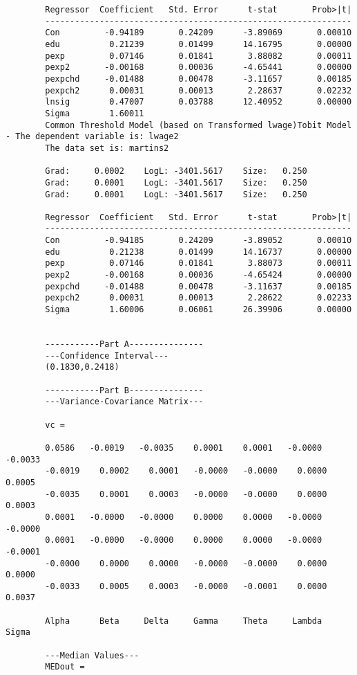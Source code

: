 \documentclass[12pt]{article}
\begin{document}
\begin{verbatim}
		Regressor  Coefficient	 Std. Error 	 t-stat       Prob>|t|
		--------------------------------------------------------------
		Con         -0.94189       0.24209      -3.89069       0.00010 
		edu          0.21239       0.01499      14.16795       0.00000 
		pexp         0.07146       0.01841       3.88082       0.00011 
		pexp2       -0.00168       0.00036      -4.65441       0.00000 
		pexpchd     -0.01488       0.00478      -3.11657       0.00185 
		pexpch2      0.00031       0.00013       2.28637       0.02232 
		lnsig        0.47007       0.03788      12.40952       0.00000 
		Sigma        1.60011 
		Common Threshold Model (based on Transformed lwage)Tobit Model - The dependent variable is: lwage2
		The data set is: martins2
		
		Grad:     0.0002    LogL: -3401.5617    Size:   0.250
		Grad:     0.0001    LogL: -3401.5617    Size:   0.250
		Grad:     0.0001    LogL: -3401.5617    Size:   0.250
		
		Regressor  Coefficient	 Std. Error 	 t-stat       Prob>|t|
		--------------------------------------------------------------
		Con         -0.94185       0.24209      -3.89052       0.00010 
		edu          0.21238       0.01499      14.16737       0.00000 
		pexp         0.07146       0.01841       3.88073       0.00011 
		pexp2       -0.00168       0.00036      -4.65424       0.00000 
		pexpchd     -0.01488       0.00478      -3.11637       0.00185 
		pexpch2      0.00031       0.00013       2.28622       0.02233 
		Sigma        1.60006       0.06061      26.39906       0.00000 
		
		
		-----------Part A--------------- 
		---Confidence Interval---
		(0.1830,0.2418)
		
		-----------Part B--------------- 
		---Variance-Covariance Matrix---
		
		vc =
		
		0.0586   -0.0019   -0.0035    0.0001    0.0001   -0.0000   -0.0033
		-0.0019    0.0002    0.0001   -0.0000   -0.0000    0.0000    0.0005
		-0.0035    0.0001    0.0003   -0.0000   -0.0000    0.0000    0.0003
		0.0001   -0.0000   -0.0000    0.0000    0.0000   -0.0000   -0.0000
		0.0001   -0.0000   -0.0000    0.0000    0.0000   -0.0000   -0.0001
		-0.0000    0.0000    0.0000   -0.0000   -0.0000    0.0000    0.0000
		-0.0033    0.0005    0.0003   -0.0000   -0.0001    0.0000    0.0037
		
		Alpha      Beta     Delta     Gamma     Theta     Lambda     Sigma 
		
		---Median Values---
		MEDout =
		

\end{verbatim}
\end{document}
